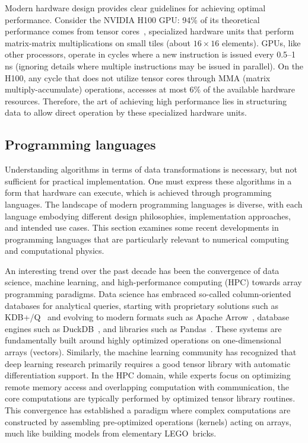 Modern hardware design provides clear guidelines for achieving optimal performance. Consider the NVIDIA H100 GPU: 94\% of its theoretical performance comes from tensor cores~, specialized hardware units that perform matrix-matrix multiplications on small tiles (about $16\times 16$ elements). GPUs, like other processors, operate in cycles where a new instruction is issued every 0.5--1 ns (ignoring details where multiple instructions may be issued in parallel). On the H100, any cycle that does not utilize tensor cores through MMA (matrix multiply-accumulate) operations, accesses at most 6\% of the available hardware resources. Therefore, the art of achieving high performance lies in structuring data to allow direct operation by these specialized hardware units.

\subsection{Programming languages}

Understanding algorithms in terms of data transformations is necessary, but not sufficient for practical implementation. One must express these algorithms in a form that hardware can execute, which is achieved through programming languages. The landscape of modern programming languages is diverse, with each language embodying different design philosophies, implementation approaches, and intended use cases. This section examines some recent developments in programming languages that are particularly relevant to numerical computing and computational physics.

An interesting trend over the past decade has been the convergence of data science, machine learning, and high-performance computing (HPC) towards array programming paradigms. Data science has embraced so-called column-oriented databases for analytical queries, starting with proprietary solutions such as KDB+/Q~ and evolving to modern formats such as Apache Arrow~, database engines such as DuckDB~, and libraries such as Pandas~\cite{reback2020pandas,McKinn_2010_Data_Structures}. These systems are fundamentally built around highly optimized operations on one-dimensional arrays (vectors). Similarly, the machine learning community has recognized that deep learning research primarily requires a good tensor library with automatic differentiation support. In the HPC domain, while experts focus on optimizing remote memory access and overlapping computation with communication, the core computations are typically performed by optimized tensor library routines. This convergence has established a paradigm where complex computations are constructed by assembling pre-optimized operations (kernels) acting on arrays, much like building models from elementary LEGO\textregistered\   bricks.

